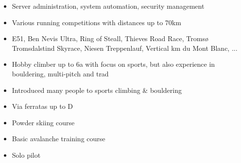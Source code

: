 \documentclass[10pt,a4paper]{altacv}
\begin{document}
    \begin{itemize}
      \item Server administration, system automation, security management
    \end{itemize}
  \divider




\begin{itemize}
  \item{Various running competitions with distances up to 70km}
  \item{E51, Ben Nevis Ultra, Ring of Steall, Thieves Road Race, Tromsø Tromsdalstind Skyrace, Niesen Treppenlauf, Vertical km du Mont Blanc, ...}
\end{itemize}
\divider

\begin{itemize}
  \item{Hobby climber up to 6a with focus on sports, but also experience in bouldering, multi-pitch and trad}
  \item {Introduced many people to sports climbing \& bouldering}
  \item{Via ferratas up to D}
\end{itemize}
\divider

\begin{itemize}
  \item{Powder skiing course}
  \item{Basic avalanche training course}

\end{itemize}
\divider

\begin{itemize}
  \item{Solo pilot}
\end{itemize}
\end{document}
